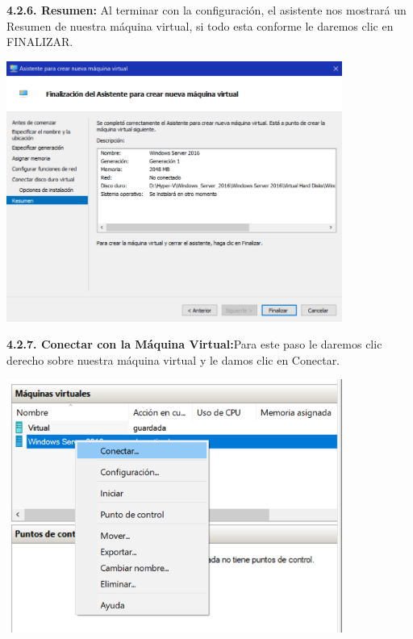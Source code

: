 \textbf {4.2.6. Resumen:} Al terminar con la configuración, el asistente nos mostrará un Resumen de nuestra máquina virtual, si todo esta conforme le daremos clic en FINALIZAR.
\begin{center}
  \includegraphics[width=11cm]{Imagenes/Resumen.png}
\end{center}
\break

\textbf {4.2.7. Conectar con la Máquina Virtual:}Para este paso le daremos clic derecho sobre nuestra máquina virtual y le damos clic en Conectar.
\begin{center}
  \includegraphics[width=11cm]{Imagenes/Conectar_WindowsServer.png}
\end{center}

